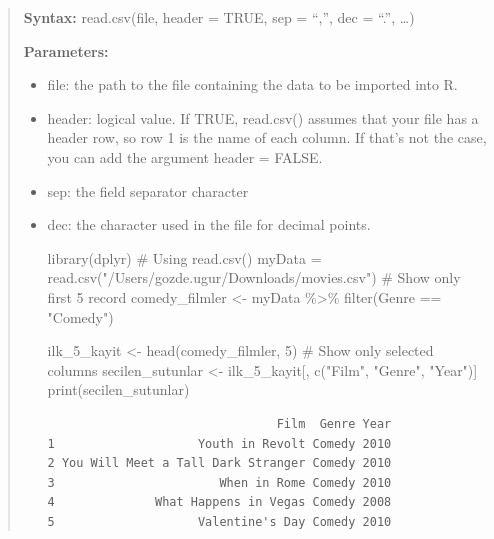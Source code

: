 \documentclass[
  letterpaper,
  DIV=11,
  numbers=noendperiod]{scrreprt}
\newenvironment{Shaded}{\begin{snugshade}}{\end{snugshade}}
\newcommand{\CommentTok}[1]{\textcolor[rgb]{0.37,0.37,0.37}{#1}}
\newcommand{\DecValTok}[1]{\textcolor[rgb]{0.68,0.00,0.00}{#1}}
\newcommand{\FunctionTok}[1]{\textcolor[rgb]{0.28,0.35,0.67}{#1}}
\newcommand{\NormalTok}[1]{\textcolor[rgb]{0.00,0.23,0.31}{#1}}
\newcommand{\OtherTok}[1]{\textcolor[rgb]{0.00,0.23,0.31}{#1}}
\newcommand{\SpecialCharTok}[1]{\textcolor[rgb]{0.37,0.37,0.37}{#1}}
\newcommand{\StringTok}[1]{\textcolor[rgb]{0.13,0.47,0.30}{#1}}
\begin{document}
\begin{quote}
\textbf{Syntax:} read.csv(file, header = TRUE, sep = ``,'', dec = ``.'',
\ldots)

\textbf{Parameters:}

\begin{itemize}
\item
  file: the path to the file containing the data to be imported into R.
\item
  header: logical value. If TRUE, read.csv() assumes that your file has
  a header row, so row 1 is the name of each column. If that's not the
  case, you can add the argument header = FALSE.
\item
  sep: the field separator character
\item
  dec: the character used in the file for decimal points.

\begin{Shaded}
\begin{Highlighting}[]
\FunctionTok{library}\NormalTok{(dplyr)}
\CommentTok{\# Using read.csv()}
\NormalTok{myData }\OtherTok{=} \FunctionTok{read.csv}\NormalTok{(}\StringTok{"/Users/gozde.ugur/Downloads/movies.csv"}\NormalTok{) }
\CommentTok{\# Show only first 5 record}
\NormalTok{comedy\_filmler }\OtherTok{\textless{}{-}}\NormalTok{ myData }\SpecialCharTok{\%\textgreater{}\%} \FunctionTok{filter}\NormalTok{(Genre }\SpecialCharTok{==} \StringTok{"Comedy"}\NormalTok{)}

\NormalTok{ilk\_5\_kayit }\OtherTok{\textless{}{-}} \FunctionTok{head}\NormalTok{(comedy\_filmler, }\DecValTok{5}\NormalTok{)}
\CommentTok{\# Show only selected columns}
\NormalTok{secilen\_sutunlar }\OtherTok{\textless{}{-}}\NormalTok{ ilk\_5\_kayit[, }\FunctionTok{c}\NormalTok{(}\StringTok{"Film"}\NormalTok{, }\StringTok{"Genre"}\NormalTok{, }\StringTok{"Year"}\NormalTok{)]}
\FunctionTok{print}\NormalTok{(secilen\_sutunlar)}
\end{Highlighting}
\end{Shaded}

\begin{verbatim}
                                Film  Genre Year
1                    Youth in Revolt Comedy 2010
2 You Will Meet a Tall Dark Stranger Comedy 2010
3                       When in Rome Comedy 2010
4              What Happens in Vegas Comedy 2008
5                    Valentine's Day Comedy 2010
\end{verbatim}
\end{itemize}
\end{quote}
\end{document}
